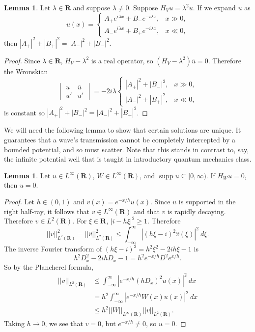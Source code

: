 \documentclass[12pt]{report}
\newcommand{\RR}{\mathbf{R}}
\DeclareMathOperator{\supp}{supp}
\theoremstyle{definition}
\newtheorem{lemma}[theorem]{Lemma}
\begin{document}
\begin{lemma}
\label{no outgoing solutions, part 1}
Let $\lambda \in \RR$ and suppose $\lambda \neq 0$. Suppose $H_Vu = \lambda^2u$. If we expand $u$ as
$$u(x) = \begin{cases}
  A_+ e^{i\lambda x} + B_-e^{-i\lambda x}, &x \gg 0,\\
  A_- e^{i\lambda x} + B_+e^{-i\lambda x}, &x \ll 0,
\end{cases}$$
then $|A_+|^2 + |B_+|^2 = |A_-|^2 + |B_-|^2$.
\end{lemma}
\begin{proof}
Since $\lambda \in \RR$, $H_V - \lambda^2$ is a real operator, so $(H_V - \lambda^2) \overline u = 0$. Therefore the Wronskian
$$\begin{vmatrix}
u&\overline u\\u' & \overline u'
\end{vmatrix} = -2i\lambda \begin{cases}
|A_+|^2 + |B_-|^2, &x \gg 0,\\
|A_-|^2 + |B_+|^2, &x \ll 0,
\end{cases}$$
is constant so $|A_+|^2 + |B_-|^2 = |A_-|^2 + |B_+|^2$.
\end{proof}

We will need the following lemma to show that certain solutions are unique. It guarantees that a wave's transmission cannot be completely intercepted by a bounded potential, and so must scatter. Note that this stands in contrast to, say, the infinite potential well that is taught in introductory quantum mechanics class.
\begin{lemma}
\label{bounded potentials must scatter}
Let $u \in L^\infty(\RR)$, $W \in L^\infty(\RR)$, and $\supp u \subseteq [0, \infty)$. If $H_Wu = 0$, then $u = 0$.
\end{lemma}
\begin{proof}
Let $h \in (0, 1)$ and $v(x) = e^{-x/h}u(x)$. Since $u$ is supported in the right half-ray, it follows that $v \in L^\infty(\RR)$ and that $v$ is rapidly decaying. Therefore $v \in L^2(\RR)$. For $\xi \in \RR$, $|i - h\xi|^2 \geq 1$. Therefore
$$||v||_{L^2(\RR)}^2 = ||\hat v||_{L^2(\RR)}^2 \leq \int_{-\infty}^\infty |(h\xi - i)^2\hat v(\xi)|^2 ~d\xi.$$
The inverse Fourier transform of $(h\xi - i)^2 = h^2\xi^2 - 2ih\xi - 1$ is
$$h^2D^2_x - 2ihD_x - 1 = h^2 e^{-x/h} D^2 e^{x/h}.$$
So by the Plancherel formula,
\begin{align*}
  ||v||_{L^2(\RR)} &\leq \int_{-\infty}^\infty |e^{-x/h}(hD_x)^2 u(x)|^2 ~dx
  \\&= h^2 \int_{-\infty}^\infty |e^{-x/h}W(x)u(x)|^2 ~dx
  \\&\leq h^2 ||W||_{L^\infty(\RR)} ||v||_{L^2(\RR)}.
\end{align*}
Taking $h \to 0$, we see that $v = 0$, but $e^{-x/h} \neq 0$, so $u = 0$.
\end{proof}
\end{document}
